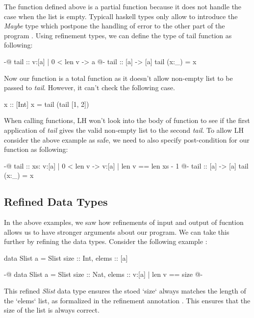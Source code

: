 \documentclass[]{rptuseminar}
\begin{document}
The function defined above is a partial function because it does not handle the case when the list is empty. 
Typicall haskell types only allow to introduce the \textit{Maybe} type which postpone the handling of error to the other 
part of the program \cite{jhala_programming_2020}. Using refinement types, we can define the type of tail function as following:

\begin{haskell}
 {-@ tail :: {v:[a] | 0 < len v} -> a @-}
 tail :: [a] -> [a]
 tail (x:_) = x
\end{haskell}

Now our function is a total function as it doesn't allow non-empty list to be passed to \textit{tail}. However, it can't 
check the following case.

\begin{haskell}
 x :: [Int]
 x = tail (tail [1, 2])
\end{haskell}

When calling functions, LH won't look into the body of function to see if the first application of \textit{tail} gives the valid non-empty list to the second \textit{tail}.
To allow LH consider the above example as safe, we need to also specify post-condition for our function as following:

\begin{haskell}
 {-@ tail :: xs: {v:[a] | 0 < len v} -> {v:[a] | len v == len xs - 1} @-}
 tail :: [a] -> [a]
 tail (x:_) = x
\end{haskell}

\subsection{Refined Data Types}
In the above examples, we saw how refinements of input and output of fucntion allows us to have stronger arguments about our program. 
We can take this further by refining the data types. Consider the following example \cite{jhala_programming_2020}:

\begin{haskell}
  data Slist a = Slist { size :: Int, elems :: [a] }

  {-@ data Slist a = Slist { size :: Nat, elems :: {v:[a] | len v == size} } @-}
\end{haskell}

This refined \textit{Slist} data type ensures the stoed `size` always matches the length of the `elems` list, 
as formalized in the refinement annotation \cite{jhala_programming_2020} . 
This ensures that the size of the list is always correct.
\end{document}
